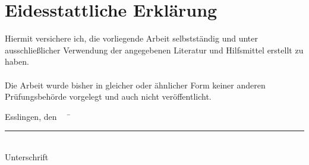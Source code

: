 
\chapter*{Eidesstattliche Erklärung}

Hiermit versichere ich, die vorliegende Arbeit selbstständig und unter ausschließlicher Verwendung der angegebenen Literatur und Hilfsmittel erstellt zu haben.\\\\
Die Arbeit wurde bisher in gleicher oder ähnlicher Form keiner anderen Prüfungsbehörde vorgelegt und auch nicht veröffentlicht.\\
\begin{tabbing}
          Esslingen, den \workDatum ~~	\= \rule{5cm}{0.3mm}\\
                                                                                                    \> Unterschrift
\end{tabbing}
%


